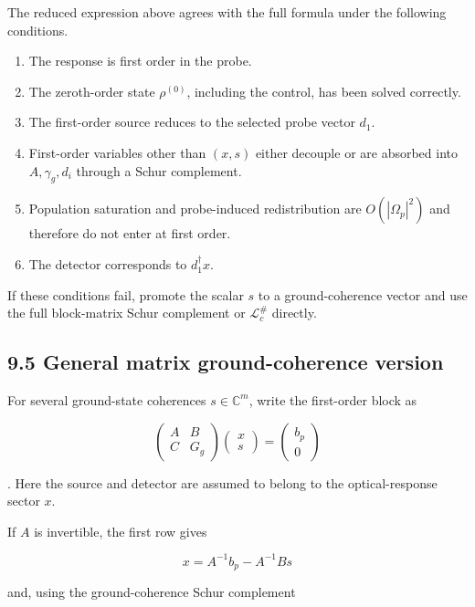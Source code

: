 \documentclass[
  10pt,
  a4paper,
]{article}
\providecommand{\tightlist}{%
  \setlength{\itemsep}{0pt}\setlength{\parskip}{0pt}}
\begin{document}
The reduced expression above agrees with the full formula under the
following conditions.

\begin{enumerate}
\def\labelenumi{\arabic{enumi}.}
\tightlist
\item
  The response is first order in the probe.
\item
  The zeroth-order state \(\rho^{(0)}\), including the control, has been
  solved correctly.
\item
  The first-order source reduces to the selected probe vector \(d_1\).
\item
  First-order variables other than \((x,s)\) either decouple or are
  absorbed into \(A,\gamma_g,d_i\) through a Schur complement.
\item
  Population saturation and probe-induced redistribution are
  \(O(|\Omega_p|^2)\) and therefore do not enter at first order.
\item
  The detector corresponds to \(d_1^\dagger x\).
\end{enumerate}

If these conditions fail, promote the scalar \(s\) to a ground-coherence
vector and use the full block-matrix Schur complement or
\(\mathcal L_c^\#\) directly.

\subsection{9.5 General matrix ground-coherence
version}\label{general-matrix-ground-coherence-version}

For several ground-state coherences \(s\in\mathbb C^m\), write the
first-order block as

\[
\begin{pmatrix}
A&B\\
C&G_g
\end{pmatrix}
\begin{pmatrix}x\\s\end{pmatrix}
=
\begin{pmatrix}b_p\\0\end{pmatrix}
\]

. Here the source and detector are assumed to belong to the
optical-response sector \(x\).

If \(A\) is invertible, the first row gives

\[
x=A^{-1}b_p-A^{-1}Bs
\]

and, using the ground-coherence Schur complement
\end{document}
